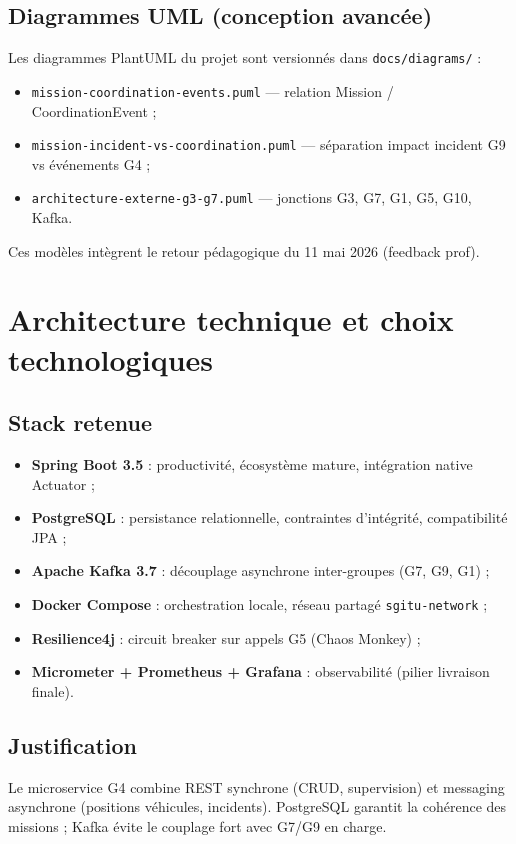 \documentclass[12pt,a4paper]{report}
\begin{document}
\section{Diagrammes UML (conception avancée)}
Les diagrammes PlantUML du projet sont versionnés dans \texttt{docs/diagrams/} :
\begin{itemize}
    \item \texttt{mission-coordination-events.puml} — relation Mission / CoordinationEvent ;
    \item \texttt{mission-incident-vs-coordination.puml} — séparation impact incident G9 vs événements G4 ;
    \item \texttt{architecture-externe-g3-g7.puml} — jonctions G3, G7, G1, G5, G10, Kafka.
\end{itemize}
Ces modèles intègrent le retour pédagogique du 11 mai 2026 (feedback prof).

\chapter{Architecture technique et choix technologiques}

\section{Stack retenue}
\begin{itemize}
    \item \textbf{Spring Boot 3.5} : productivité, écosystème mature, intégration native Actuator ;
    \item \textbf{PostgreSQL} : persistance relationnelle, contraintes d'intégrité, compatibilité JPA ;
    \item \textbf{Apache Kafka 3.7} : découplage asynchrone inter-groupes (G7, G9, G1) ;
    \item \textbf{Docker Compose} : orchestration locale, réseau partagé \texttt{sgitu-network} ;
    \item \textbf{Resilience4j} : circuit breaker sur appels G5 (Chaos Monkey) ;
    \item \textbf{Micrometer + Prometheus + Grafana} : observabilité (pilier livraison finale).
\end{itemize}

\section{Justification}
Le microservice G4 combine REST synchrone (CRUD, supervision) et messaging asynchrone (positions véhicules, incidents). PostgreSQL garantit la cohérence des missions ; Kafka évite le couplage fort avec G7/G9 en charge.
\end{document}
